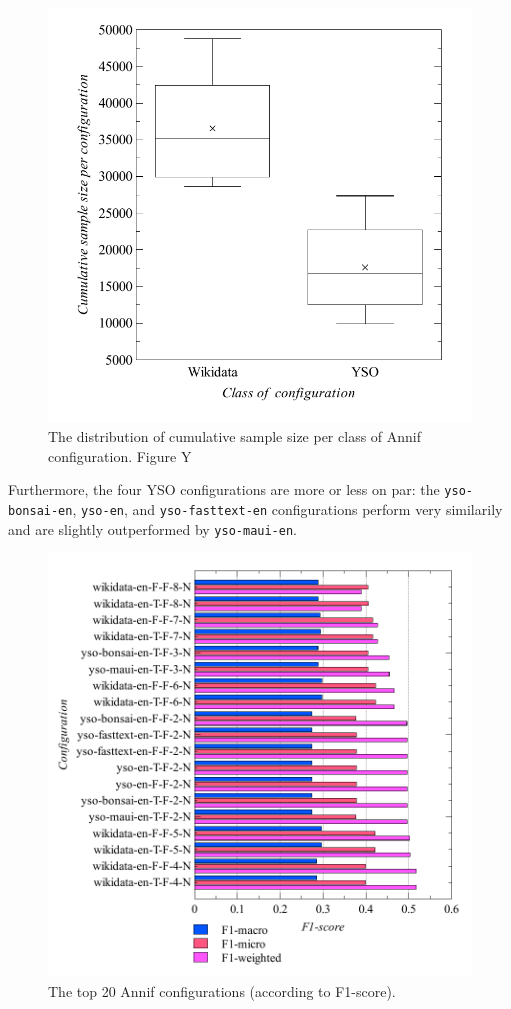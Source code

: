 \begin{figure}
\centering
\includegraphics{images/metrics_all_productivity.pdf}
\caption{The distribution of cumulative sample size per class of Annif
configuration. Figure Y}
\end{figure}

Furthermore, the four YSO configurations are more or less on par: the
\texttt{yso-bonsai-en}, \texttt{yso-en}, and \texttt{yso-fasttext-en}
configurations perform very similarily and are slightly outperformed by
\texttt{yso-maui-en}.

\begin{figure}
\centering
\includegraphics{images/metrics_f1_top20.pdf}
\caption{The top 20 Annif configurations (according to F1-score).}
\end{figure}


